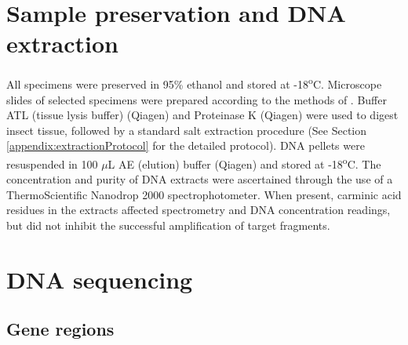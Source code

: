 \section{Sample preservation and DNA extraction}
All specimens were preserved in 95\% ethanol and stored at -18\textsuperscript{o}C. Microscope slides of selected specimens were prepared according to the methods of \citet{Ben-Dov1997}. 
Buffer ATL (tissue lysis buffer) (Qiagen\textsuperscript{\textcopyright}) and Proteinase K (Qiagen\textsuperscript{\textcopyright}) were used to digest insect tissue, followed by a standard salt extraction procedure \citep{Bruford1992} (See Section \ref{appendix:extractionProtocol} for the detailed protocol). DNA pellets were resuspended in 100 $\mu$L AE (elution) buffer (Qiagen\textsuperscript{\textcopyright}) and stored at -18\textsuperscript{o}C. The concentration and purity of DNA extracts were ascertained through the use of a ThermoScientific Nanodrop 2000 spectrophotometer. When present, carminic acid residues in the extracts affected spectrometry and DNA concentration readings, but did not inhibit the successful amplification of target fragments.  

\section{DNA sequencing}

\subsection{Gene regions}

